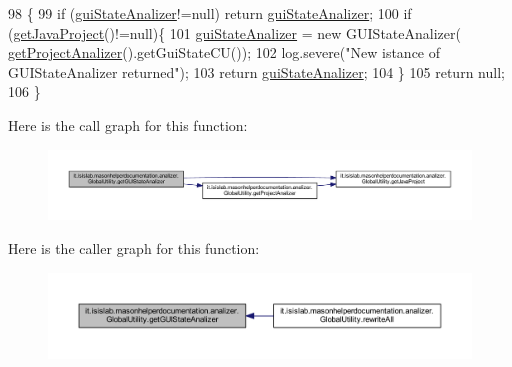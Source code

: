 \begin{DoxyCode}
98                                                         \{
99         \textcolor{keywordflow}{if} (\hyperlink{classit_1_1isislab_1_1masonhelperdocumentation_1_1analizer_1_1_global_utility_a0104f618583fd4e003dcc2b40ba5b8e8}{guiStateAnalizer}!=null) \textcolor{keywordflow}{return} \hyperlink{classit_1_1isislab_1_1masonhelperdocumentation_1_1analizer_1_1_global_utility_a0104f618583fd4e003dcc2b40ba5b8e8}{guiStateAnalizer};
100         \textcolor{keywordflow}{if} (\hyperlink{classit_1_1isislab_1_1masonhelperdocumentation_1_1analizer_1_1_global_utility_a1ce214dc72551ff78133933c461d4e59}{getJavaProject}()!=null)\{
101             \hyperlink{classit_1_1isislab_1_1masonhelperdocumentation_1_1analizer_1_1_global_utility_a0104f618583fd4e003dcc2b40ba5b8e8}{guiStateAnalizer} = \textcolor{keyword}{new} GUIStateAnalizer(
      \hyperlink{classit_1_1isislab_1_1masonhelperdocumentation_1_1analizer_1_1_global_utility_af6bcca0c06ec6fa8c2b2b88f5050914c}{getProjectAnalizer}().getGuiStateCU());        
102             log.severe(\textcolor{stringliteral}{"New istance of GUIStateAnalizer returned"});
103             \textcolor{keywordflow}{return} \hyperlink{classit_1_1isislab_1_1masonhelperdocumentation_1_1analizer_1_1_global_utility_a0104f618583fd4e003dcc2b40ba5b8e8}{guiStateAnalizer};
104         \}
105         \textcolor{keywordflow}{return} null;
106     \}
\end{DoxyCode}


Here is the call graph for this function\-:\nopagebreak
\begin{figure}[H]
\begin{center}
\leavevmode
\includegraphics[width=350pt]{classit_1_1isislab_1_1masonhelperdocumentation_1_1analizer_1_1_global_utility_afcb5ea1aa5461f297ee3683d8528e6b9_cgraph}
\end{center}
\end{figure}




Here is the caller graph for this function\-:\nopagebreak
\begin{figure}[H]
\begin{center}
\leavevmode
\includegraphics[width=350pt]{classit_1_1isislab_1_1masonhelperdocumentation_1_1analizer_1_1_global_utility_afcb5ea1aa5461f297ee3683d8528e6b9_icgraph}
\end{center}
\end{figure}


